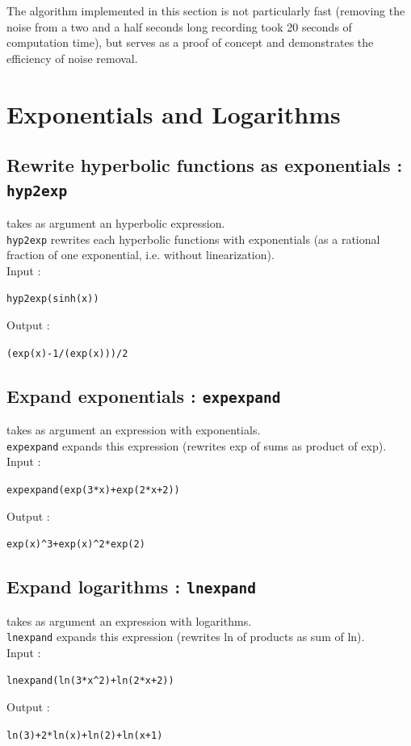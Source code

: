 \documentclass[a4paper,11pt]{book}
\begin{document}
The algorithm implemented in this section is not particularly fast (removing the noise from a two and a half seconds long recording took 20 seconds of computation time), but serves as a proof of concept and demonstrates the efficiency of noise removal.


\section{Exponentials and Logarithms}
\subsection{Rewrite hyperbolic functions as exponentials : {\tt hyp2exp}}
 takes as argument an hyperbolic expression.\\
{\tt hyp2exp} rewrites each hyperbolic functions with exponentials
(as a rational fraction of one exponential,
i.e. {\sc without} linearization).\\ 
Input :
\begin{center}{\tt hyp2exp(sinh(x))}\end{center}
Output :
\begin{center}{\tt (exp(x)-1/(exp(x)))/2}\end{center}

\subsection{Expand exponentials : {\tt expexpand}}
 takes as argument an expression with exponentials.\\
{\tt expexpand} expands this expression (rewrites exp of sums as
product of exp).\\
Input :
\begin{center}{\tt expexpand(exp(3*x)+exp(2*x+2))}\end{center}
Output :
\begin{center}{\tt exp(x)\verb|^|3+exp(x)\verb|^|2*exp(2)}\end{center}

\subsection{Expand logarithms : {\tt lnexpand}}
 takes as argument an expression with logarithms.\\
{\tt lnexpand} expands this expression (rewrites ln of products
as sum of ln).\\
Input :
\begin{center}{\tt lnexpand(ln(3*x\verb|^|2)+ln(2*x+2))}\end{center}
Output :
\begin{center}{\tt  ln(3)+2*ln(x)+ln(2)+ln(x+1)}\end{center}
\end{document}
